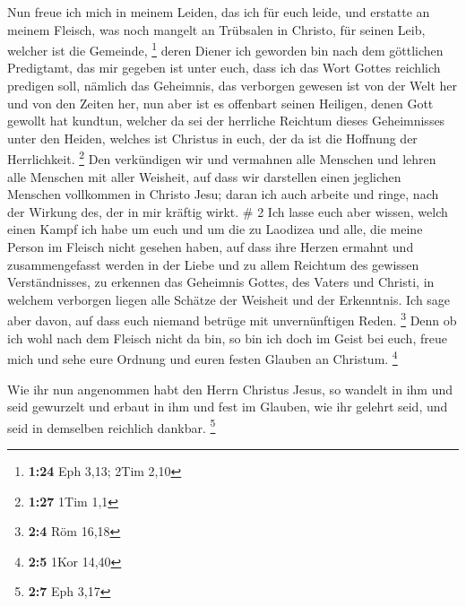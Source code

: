  Nun freue ich mich in meinem Leiden, das ich für euch
leide, und erstatte an meinem Fleisch, was noch mangelt an Trübsalen in
Christo, für seinen Leib, welcher ist die Gemeinde, \footnote{\textbf{1:24}
  Eph 3,13; 2Tim 2,10}  deren Diener ich geworden bin
nach dem göttlichen Predigtamt, das mir gegeben ist unter euch, dass ich
das Wort Gottes reichlich predigen soll,  nämlich das
Geheimnis, das verborgen gewesen ist von der Welt her und von den Zeiten
her, nun aber ist es offenbart seinen Heiligen,  denen
Gott gewollt hat kundtun, welcher da sei der herrliche Reichtum dieses
Geheimnisses unter den Heiden, welches ist Christus in euch, der da ist
die Hoffnung der Herrlichkeit. \footnote{\textbf{1:27} 1Tim 1,1}
 Den verkündigen wir und vermahnen alle Menschen und
lehren alle Menschen mit aller Weisheit, auf dass wir darstellen einen
jeglichen Menschen vollkommen in Christo Jesu;  daran ich
auch arbeite und ringe, nach der Wirkung des, der in mir kräftig wirkt.
\# 2  Ich lasse euch aber wissen, welch einen Kampf ich
habe um euch und um die zu Laodizea und alle, die meine Person im
Fleisch nicht gesehen haben,  auf dass ihre Herzen ermahnt
und zusammengefasst werden in der Liebe und zu allem Reichtum des
gewissen Verständnisses, zu erkennen das Geheimnis Gottes, des Vaters
und Christi,  in welchem verborgen liegen alle Schätze der
Weisheit und der Erkenntnis.  Ich sage aber davon, auf
dass euch niemand betrüge mit unvernünftigen Reden. \footnote{\textbf{2:4}
  Röm 16,18}  Denn ob ich wohl nach dem Fleisch nicht da
bin, so bin ich doch im Geist bei euch, freue mich und sehe eure Ordnung
und euren festen Glauben an Christum. \footnote{\textbf{2:5} 1Kor 14,40}

 Wie ihr nun angenommen habt den Herrn Christus Jesus, so
wandelt in ihm  und seid gewurzelt und erbaut in ihm und
fest im Glauben, wie ihr gelehrt seid, und seid in demselben reichlich
dankbar. \footnote{\textbf{2:7} Eph 3,17}

